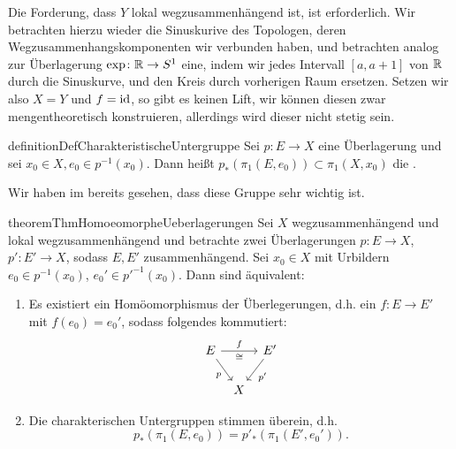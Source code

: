 \begin{example}
    Die Forderung, dass $Y$ lokal wegzusammenhängend ist, ist erforderlich. Wir betrachten hierzu wieder die Sinuskurive des Topologen, deren Wegzusammenhangskomponenten wir verbunden haben, und betrachten analog zur Überlagerung  $\exp \colon  \mathbb{R} \to  S^1$ eine, indem wir jedes Intervall $[a,a+1]$ von  $\mathbb{R}$ durch die Sinuskurve, und den Kreis durch vorherigen Raum ersetzen.
    Setzen wir also $X = Y$ und  $f = \mathrm{id}$, so gibt es keinen Lift, wir können diesen zwar mengentheoretisch konstruieren, allerdings wird dieser nicht stetig sein.
\end{example}

\begin{restatable}{definition}{DefCharakteristischeUntergruppe}\label{def:charakteristische-untegruppe}
    Sei $p\colon  E \to  X$ eine Überlagerung und sei $x_0\in X, e_0\in p^{-1} (x_0)$. Dann heißt $p_*(\pi_1(E,e_0))\subset \pi_1(X,x_0)$ die . 
\end{restatable}

\begin{oral}
    Wir haben im  bereits gesehen, dass diese Gruppe sehr wichtig ist.
\end{oral}

\begin{restatable}{theorem}{ThmHomoeomorpheUeberlagerungen}\label{thm:äquivalenz-von-überlagerungen-über-lokal-wegzsuammenhängendem-wegzusammenhängendem-raum}
    Sei $X$ wegzusammenhängend und lokal wegzusammenhängend und betrachte zwei Überlagerungen $p\colon  E\to X$, $p' \colon  E' \to  X$, sodass $E,E'$ zusammenhängend. Sei  $x_0\in X$ mit Urbildern $e_0\in p^{-1} (x_0)$, $e_0' \in p'^{-1} (x_0)$. Dann sind äquivalent:
    \begin{enumerate}[1)]
        \item Es existiert ein Homöomorphismus der Überlegerungen, d.h. ein $f\colon  E \to  E'$ mit $f(e_0) = e_0'$, sodass folgendes kommutiert:
            \[
            \begin{tikzcd}[column sep = tiny]
                E \ar{rr}{f}[swap]{\cong} \ar[swap]{dr}{p} & & E' \ar{dl}{p'} \\
            & X
            \end{tikzcd}
            \]
        \item Die charakterischen Untergruppen stimmen überein, d.h.
            \[
                p_*(\pi_1(E,e_0)) = p'_*(\pi_1(E',e_0'))
            .\] 
    \end{enumerate}
\end{restatable}

